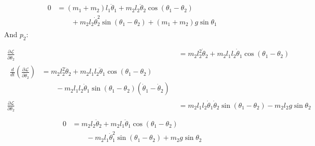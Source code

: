 \begin{align}
	\begin{split}
		0&=(m_1+m_2)l_1\ddot\theta_1+m_2l_2\ddot\theta_2\cos{(\theta_1-\theta_2)}\\
		&\qquad+m_2l_2\dot\theta_2^2\sin{(\theta_1-\theta_2)}+(m_1+m_2)g\sin{\theta_1}
	\end{split}
\end{align}
And $p_2$:

\begin{align}
	\frac{\partial \mathcal{L}}{\partial \dot\theta_2}&=m_2l_2^2\dot\theta_2+m_2l_1l_2\dot\theta_1\cos{(\theta_1-\theta_2)}\\
	\begin{split}
		\frac{d}{dt}\left(\frac{\partial \mathcal{L}}{\partial \dot\theta_2}\right)&=m_2l_2^2\ddot\theta_2+m_2l_1l_2\ddot\theta_1\cos{(\theta_1-\theta_2)}\\
		&\qquad -m_2l_1l_2\dot\theta_1\sin{(\theta_1-\theta_2)}(\dot\theta_1-\dot\theta_2)
	\end{split}\\
	\frac{\partial \mathcal{L}}{\partial \theta_2} &=m_2l_1l_2\dot\theta_1\dot\theta_2\sin{(\theta_1-\theta_2)}-m_2l_2g\sin{\theta_2}\\
	\label{eq:part}
\end{align}
\begin{align}
	\begin{split}
		0&=m_2l_2\ddot\theta_2+m_2l_1\ddot\theta_1\cos{(\theta_1-\theta_2)}\\
		&\qquad-m_2l_1\dot\theta_1^2\sin{(\theta_1-\theta_2)}+m_2g\sin{\theta_2}
	\end{split}
\end{align}

